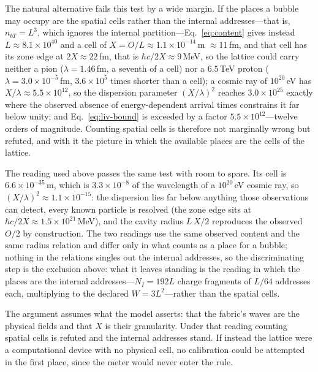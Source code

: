 \documentclass[a4paper]{article}
\begin{document}
The natural alternative fails this test by a wide margin.  If the places a bubble may occupy are the spatial cells rather than the internal addresses---that is, $n_{bT}=L^{3}$, which ignores the internal partition---Eq.~\eqref{eq:content} gives instead $L\approx8.1\times10^{40}$ and a cell of $X=O/L\approx1.1\times10^{-14}$\,m $\approx11$\,fm, and that cell has its zone edge at $2X\approx22$\,fm, that is $\hbar c/2X\approx9$\,MeV, so the lattice could carry neither a pion ($\lambda=1.46$\,fm, a seventh of a cell) nor a $6.5$\,TeV proton ($\lambda=3.0\times10^{-5}$\,fm, $3.6\times10^{5}$ times shorter than a cell); a cosmic ray of $10^{20}$\,eV has $X/\lambda\approx5.5\times10^{12}$, so the dispersion parameter $(X/\lambda)^{2}$ reaches $3.0\times10^{25}$ exactly where the observed absence of energy-dependent arrival times constrains it far below unity; and Eq.~\eqref{eq:liv-bound} is exceeded by a factor $5.5\times10^{12}$---twelve orders of magnitude.  Counting spatial cells is therefore not marginally wrong but refuted, and with it the picture in which the available places are the cells of the lattice.

The reading used above passes the same test with room to spare.  Its cell is $6.6\times10^{-35}$\,m, which is $3.3\times10^{-8}$ of the wavelength of a $10^{20}$\,eV cosmic ray, so $(X/\lambda)^{2}\approx1.1\times10^{-15}$: the dispersion lies far below anything those observations can detect, every known particle is resolved (the zone edge sits at $\hbar c/2X\approx1.5\times10^{21}$\,MeV), and the cavity radius $L\,X/2$ reproduces the observed $O/2$ by construction.  The two readings use the same observed content and the same radius relation and differ only in what counts as a place for a bubble; nothing in the relations singles out the internal addresses, so the discriminating step is the exclusion above: what it leaves standing is the reading in which the places are the internal addresses---$N_I=192L$ charge fragments of $L/64$ addresses each, multiplying to the declared $W=3L^{2}$---rather than the spatial cells.

The argument assumes what the model asserts: that the fabric's waves are the physical fields and that $X$ is their granularity.  Under that reading counting spatial cells is refuted and the internal addresses stand.  If instead the lattice were a computational device with no physical cell, no calibration could be attempted in the first place, since the meter would never enter the rule.
\end{document}
